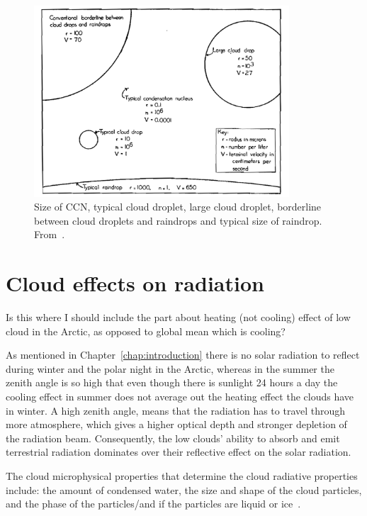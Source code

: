\begin{figure}
\centering
\includegraphics[width=0.85\textwidth]{theory/dropletsize.png}
\caption{Size of CCN, typical cloud droplet, large cloud droplet, borderline between cloud droplets and raindrops and typical size of raindrop.%
 From~\citep{McDonald1958}.}
\label{fig:dropletsize}
\end{figure}

\section{Cloud effects on radiation}
Is this where I should include the part about heating (not cooling) effect of low cloud in the Arctic, as opposed to global mean which is cooling?

As mentioned in Chapter~\ref{chap:introduction} there is no solar radiation to reflect during winter and the polar night in the Arctic, whereas in the summer the zenith angle is so high that even though there is sunlight 24 hours a day the cooling effect in summer does not average out the heating effect the clouds have in winter. A high zenith angle, means that the radiation has to travel through more atmosphere, which gives a higher optical depth and stronger depletion of the radiation beam. Consequently, the low clouds' ability to absorb and emit terrestrial radiation dominates over their reflective effect on the solar radiation.

The cloud microphysical properties that determine the cloud radiative properties include: the amount of condensed water, the size and shape of the cloud particles, and the phase of the particles/and if the particles are liquid or ice~\citep{Curry1996}.
